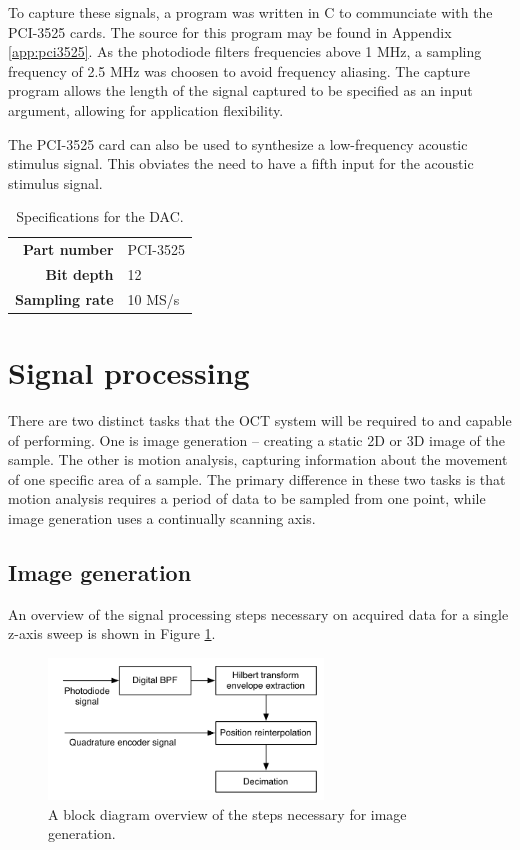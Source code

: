 To capture these signals, a program was written in C to communciate with the PCI-3525 cards. The source for this program may be found in Appendix \ref{app:pci3525}. As the photodiode filters frequencies above 1 MHz, a sampling frequency of 2.5 MHz was choosen to avoid frequency aliasing. The capture program allows the length of the signal captured to be specified as an input argument, allowing for application flexibility.

The PCI-3525 card can also be used to synthesize a low-frequency acoustic stimulus signal. This obviates the need to have a fifth input for the acoustic stimulus signal.

\begin{table}[h!]
\centering
\begin{tabular}{ >{\bf}r | l}
Part number & PCI-3525 \\
Bit depth & 12 \\
Sampling rate & 10 MS/s \\
\end{tabular}
\caption{Specifications for the DAC. \label{table:dac}}
\end{table}

\section{Signal processing}
\label{sec:sig_proc}

There are two distinct tasks that the OCT system will be required to and capable of performing. One is image generation -- creating a static 2D or 3D image of the sample. The other is motion analysis, capturing information about the movement of one specific area of a sample. The primary difference in these two tasks is that motion analysis requires a period of data to be sampled from one point, while image generation uses a continually scanning axis.


\subsection{Image generation}

An overview of the signal processing steps necessary on acquired data for a single z-axis sweep is shown in Figure \ref{fig:imagegen}.

\begin{figure}[h!]
\centering
\includegraphics[width=0.65\textwidth]{Images/Background/image_analysis.png}
\caption{A block diagram overview of the steps necessary for image generation. \label{fig:imagegen}}
\end{figure}

